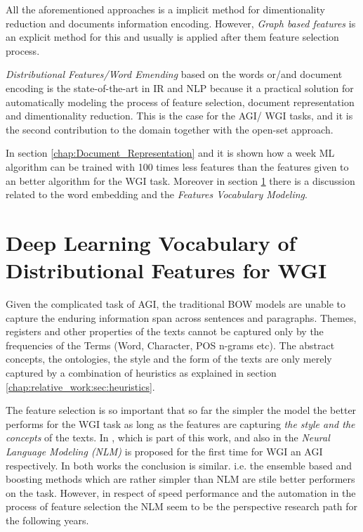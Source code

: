 All the aforementioned approaches is a implicit method for dimentionality reduction and documents information encoding. However, \textit{Graph based features} is an explicit method for this and usually is applied after them feature selection process.

\textit{Distributional Features/Word Emending} based on the words or/and document encoding is the state-of-the-art in IR and NLP because it a practical solution for automatically modeling the process of feature selection, document representation and dimentionality reduction. This is the case for the AGI/ WGI tasks, and it is the second contribution to the domain together with the open-set approach.

In section \ref{chap:Document_Representation} and it is shown how a week ML algorithm can be trained with 100 times less features than the features given to an better algorithm for the WGI task. Moreover in section \ref{chap:relevant_work:sec:word_embedding} there is a discussion related to the word embedding and the \textit{Features Vocabulary Modeling}.


\section{Deep Learning Vocabulary of Distributional Features for WGI}\label{chap:relevant_work:sec:word_embedding}

Given the complicated task of AGI, the traditional BOW models are unable to capture the enduring information span across sentences and paragraphs. Themes, registers and other properties of the texts cannot be captured only by the frequencies of the Terms (Word, Character, POS n-grams etc). The abstract concepts, the ontologies, the style and the form of the texts are only merely captured by a combination of heuristics as explained in section \ref{chap:relative_work:sec:heuristics}. 

The feature selection is so important that so far the simpler the model the better performs for the WGI task as long as the features are capturing \textit{the style and the concepts} of the texts. In \parencite{pritsos2019open}, which is part of this work, and also in \parencite{worsham2018genre} the \textit{Neural Language Modeling (NLM)} is proposed for the first time for WGI an AGI respectively. In both works the conclusion is similar. i.e. the ensemble based and boosting methods which are rather simpler than NLM are stile better performers on the task. However, in respect of speed performance and the automation in the process of feature selection the NLM seem to be the perspective research path for the following years.

